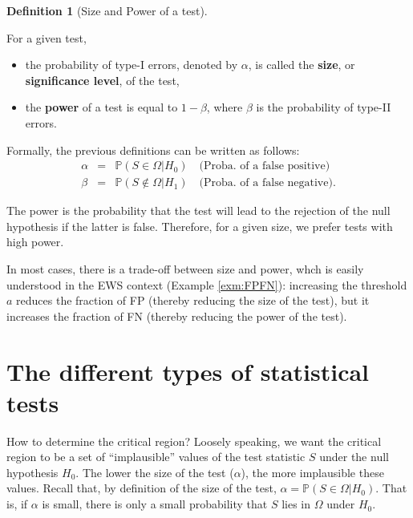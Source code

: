 \documentclass[
  12pt,
]{book}
\providecommand{\tightlist}{%
  \setlength{\itemsep}{0pt}\setlength{\parskip}{0pt}}
\theoremstyle{definition}
\newtheorem{definition}{Definition}[chapter]
\theoremstyle{definition}
\theoremstyle{definition}
\theoremstyle{definition}
\theoremstyle{remark}
\begin{document}
\begin{definition}[Size and Power of a test]
\protect\hypertarget{def:sizepower}{}\label{def:sizepower}

For a given test,

\begin{itemize}
\tightlist
\item
  the probability of type-I errors, denoted by \(\alpha\), is called the \textbf{size}, or \textbf{significance level}, of the test,
\item
  the \textbf{power} of a test is equal to \(1 - \beta\), where \(\beta\) is the probability of type-II errors.
\end{itemize}

\end{definition}

Formally, the previous definitions can be written as follows:
\begin{eqnarray}
\alpha &=& \mathbb{P}(S \in \Omega|H_0) \quad \mbox{(Proba. of a false positive)}\\
\beta &=& \mathbb{P}(S \not\in \Omega|H_1) \quad \mbox{(Proba. of a false negative)}.
\end{eqnarray}

The power is the probability that the test will lead to the rejection of the null hypothesis if the latter is false. Therefore, for a given size, we prefer tests with high power.

In most cases, there is a trade-off between size and power, whch is easily understood in the EWS context (Example \ref{exm:FPFN}): increasing the threshold \(a\) reduces the fraction of FP (thereby reducing the size of the test), but it increases the fraction of FN (thereby reducing the power of the test).

\hypertarget{the-different-types-of-statistical-tests}{%
\section{The different types of statistical tests}\label{the-different-types-of-statistical-tests}}

How to determine the critical region? Loosely speaking, we want the critical region to be a set of ``implausible'' values of the test statistic \(S\) under the null hypothesis \(H_0\). The lower the size of the test (\(\alpha\)), the more implausible these values. Recall that, by definition of the size of the test, \(\alpha = \mathbb{P}(S \in \Omega|H_0)\). That is, if \(\alpha\) is small, there is only a small probability that \(S\) lies in \(\Omega\) under \(H_0\).
\end{document}
